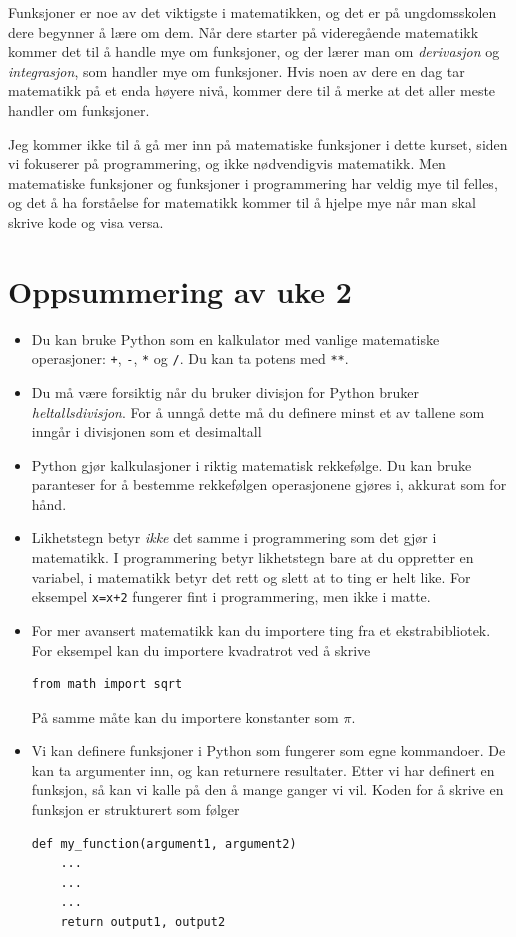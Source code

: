\documentclass[a4paper, 11pt, notitlepage]{article}
\begin{document}
Funksjoner er noe av det viktigste i matematikken, og det er på ungdomsskolen dere begynner å lære om dem. Når dere starter på videregående matematikk kommer det til å handle mye om funksjoner, og der lærer man om \emph{derivasjon} og \emph{integrasjon}, som handler mye om funksjoner. Hvis noen av dere en dag tar matematikk på et enda høyere nivå, kommer dere til å merke at det aller meste handler om funksjoner.

Jeg kommer ikke til å gå mer inn på matematiske funksjoner i dette kurset, siden vi fokuserer på programmering, og ikke nødvendigvis matematikk. Men matematiske funksjoner og funksjoner i programmering har veldig mye til felles, og det å ha forståelse for matematikk kommer til å hjelpe mye når man skal skrive kode og visa versa.

\clearpage

\section*{Oppsummering av uke 2}

\begin{itemize}
	\item Du kan bruke Python som en kalkulator med vanlige matematiske operasjoner: \verb!+!, \verb!-!, \verb!*! og  \verb!/!. Du kan ta potens med \verb!**!.
	\item Du må være forsiktig når du bruker divisjon for Python bruker \emph{heltalls\-divisjon}. For å unngå dette må du definere minst et av tallene som inngår i divisjonen som et desimaltall
	\item Python gjør kalkulasjoner i riktig matematisk rekkefølge. Du kan bruke paranteser for å bestemme rekkefølgen operasjonene gjøres i, akkurat som for hånd.
	\item Likhetstegn betyr \emph{ikke} det samme i programmering som det gjør i matematikk. I programmering betyr likhetstegn bare at du oppretter en variabel, i matematikk betyr det rett og slett at to ting er helt like. For eksempel \verb!x=x+2! fungerer fint i programmering, men ikke i matte.
	\item For mer avansert matematikk kan du importere ting fra et ekstrabibliotek. For eksempel kan du importere kvadratrot ved å skrive \begin{lstlisting}
from math import sqrt
	\end{lstlisting} På samme måte kan du importere konstanter som $\pi$.
	\item Vi kan definere funksjoner i Python som fungerer som egne kommandoer. De kan ta argumenter inn, og kan returnere resultater. Etter vi har definert en funksjon, så kan vi kalle på den å mange ganger vi vil. Koden for å skrive en funksjon er strukturert som følger
\begin{lstlisting}
def my_function(argument1, argument2)
	...
	...
	...
	return output1, output2
\end{lstlisting}

\end{itemize}
\end{document}
